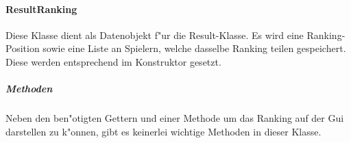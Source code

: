 \paragraph{ResultRanking}
\label{par:resultRanking}
Diese Klasse dient als Datenobjekt f"ur die Result-Klasse. Es wird eine Ranking-Position sowie eine Liste an Spielern, welche dasselbe Ranking teilen gespeichert. Diese werden entsprechend im Konstruktor gesetzt. 

\subparagraph{Methoden}
Neben den ben"otigten Gettern und einer Methode um das Ranking auf der Gui darstellen zu k"onnen, gibt es keinerlei wichtige Methoden in dieser Klasse. 